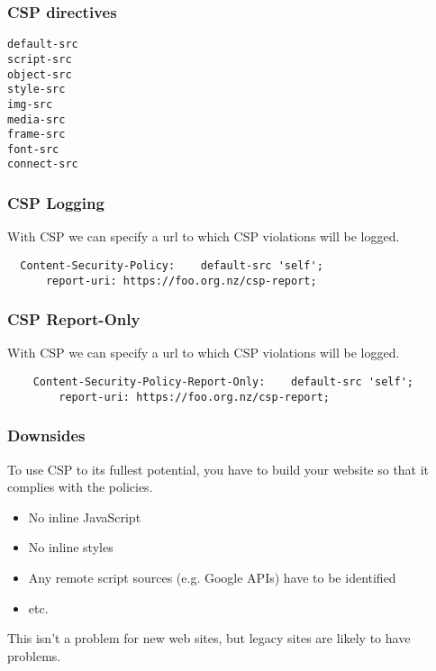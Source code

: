 \documentclass[10pt]{beamer}
\begin{document}
\begin{frame}[fragile]
\frametitle{CSP directives}

\begin{verbatim}
default-src
script-src
object-src
style-src
img-src
media-src
frame-src
font-src
connect-src
\end{verbatim}




\end{frame}

\begin{frame}[fragile]
\frametitle{CSP Logging}

With CSP we can specify a url to which CSP violations will be logged. 

\begin{verbatim}
  Content-Security-Policy:    default-src 'self'; 
      report-uri: https://foo.org.nz/csp-report;
\end{verbatim}


\end{frame}

\begin{frame}[fragile]
	\frametitle{CSP Report-Only}
	
	With CSP we can specify a url to which CSP violations will be logged. 
	
	\begin{verbatim}
	Content-Security-Policy-Report-Only:    default-src 'self'; 
	    report-uri: https://foo.org.nz/csp-report;
	\end{verbatim}
	
	
\end{frame}

\begin{frame}[fragile]
	\frametitle{Downsides}
	
	To use CSP to its fullest potential, you have to build your website
	so that it complies with the policies.
	
	\begin{itemize}
		\item No inline JavaScript
		\item No inline styles
		\item Any remote script sources (e.g. Google APIs) have to be identified
		\item etc.
	\end{itemize}
		
	This isn't a problem for new web sites, but legacy sites are likely to have problems.
\end{frame}
\end{document}
